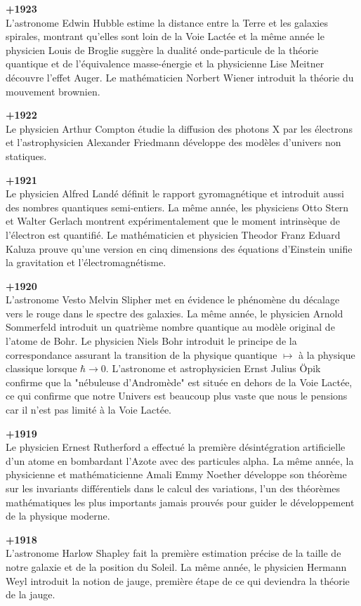 \textbf{+1923}\\
L'astronome Edwin Hubble estime la distance entre la Terre et les galaxies spirales, montrant qu'elles sont loin de la Voie Lactée et la même année le physicien Louis de Broglie suggère la dualité onde-particule de la théorie quantique et de l'équivalence masse-énergie et la physicienne Lise Meitner découvre l'effet Auger. Le mathématicien Norbert Wiener introduit la théorie du mouvement brownien.

\textbf{+1922}\\
Le physicien Arthur Compton étudie la diffusion des photons X par les électrons et l'astrophysicien Alexander Friedmann développe des modèles d'univers non statiques.

\textbf{+1921}\\
Le physicien Alfred Landé définit le rapport gyromagnétique et introduit aussi des nombres quantiques semi-entiers. La même année, les physiciens Otto Stern et Walter Gerlach montrent expérimentalement que le moment intrinsèque de l'électron est quantifié. Le mathématicien et physicien Theodor Franz Eduard Kaluza prouve qu'une version en cinq dimensions des équations d'Einstein unifie la gravitation et l'électromagnétisme.

\textbf{+1920}\\
L'astronome Vesto Melvin Slipher met en évidence le phénomène du décalage vers le rouge dans le spectre des galaxies. La même année, le physicien Arnold Sommerfeld introduit un quatrième nombre quantique au modèle original de l'atome de Bohr. Le physicien Niels Bohr introduit le principe de la correspondance assurant la transition de la physique quantique $\mapsto$ à la physique classique lorsque $\hbar \rightarrow 0$. L'astronome et astrophysicien Ernst Julius Öpik confirme que la "nébuleuse d'Andromède" est située en dehors de la Voie Lactée, ce qui confirme que notre Univers est beaucoup plus vaste que nous le pensions car il n'est pas limité à la Voie Lactée.

\textbf{+1919}\\
Le physicien Ernest Rutherford a effectué la première désintégration artificielle d'un atome en bombardant l'Azote avec des particules alpha. La même année, la physicienne et mathématicienne Amali Emmy Noether développe son théorème sur les invariants différentiels dans le calcul des variations, l'un des théorèmes mathématiques les plus importants jamais prouvés pour guider le développement de la physique moderne.

\textbf{+1918}\\
L'astronome Harlow Shapley fait la première estimation précise de la taille de notre galaxie et de la position du Soleil. La même année, le physicien Hermann Weyl introduit la notion de jauge, première étape de ce qui deviendra la théorie de la jauge.

